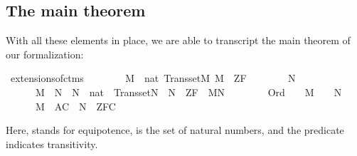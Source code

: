 \subsection{The main theorem}
With all these elements in place, we are able to transcript the main
theorem of our formalization:
\begin{isabelle}
\isamarkupfalse%
\ extensions{\isacharunderscore}of{\isacharunderscore}ctms{\isacharcolon}\isanewline
\ \ \ \isanewline
\ \ \ \ {\isachardoublequoteopen}M\ {\isasymapprox}\ nat{\isachardoublequoteclose}\ {\isachardoublequoteopen}Transset{\isacharparenleft}M{\isacharparenright}{\isachardoublequoteclose}\ {\isachardoublequoteopen}M\ {\isasymTurnstile}\ ZF{\isachardoublequoteclose}\isanewline
\ \ \ \isanewline
\ \ \ \ {\isachardoublequoteopen}{\isasymexists}N{\isachardot}\ \isanewline
\ \ \ \ \ \ M\ {\isasymsubseteq}\ N\ {\isasymand}\ N\ {\isasymapprox}\ nat\ {\isasymand}\ Transset{\isacharparenleft}N{\isacharparenright}\ {\isasymand}\ N\ {\isasymTurnstile}\ ZF\ {\isasymand}\ M{\isasymnoteq}N\ {\isasymand}\isanewline
\ \ \ \ \ \ {\isacharparenleft}{\isasymforall}{\isasymalpha}{\isachardot}\ Ord{\isacharparenleft}{\isasymalpha}{\isacharparenright}\ {\isasymlongrightarrow}\ {\isacharparenleft}{\isasymalpha}\ {\isasymin}\ M\ {\isasymlongleftrightarrow}\ {\isasymalpha}\ {\isasymin}\ N{\isacharparenright}{\isacharparenright}\ {\isasymand}\isanewline
\ \ \ \ \ \ {\isacharparenleft}M{\isacharcomma}\ {\isacharbrackleft}{\isacharbrackright}{\isasymTurnstile}\ AC\ {\isasymlongrightarrow}\ N\ {\isasymTurnstile}\ ZFC{\isacharparenright}{\isachardoublequoteclose}
\end{isabelle}
Here, \isatt{\isasymapprox} stands for equipotence,  is the
set of natural numbers, and the predicate 
 indicates transitivity.

